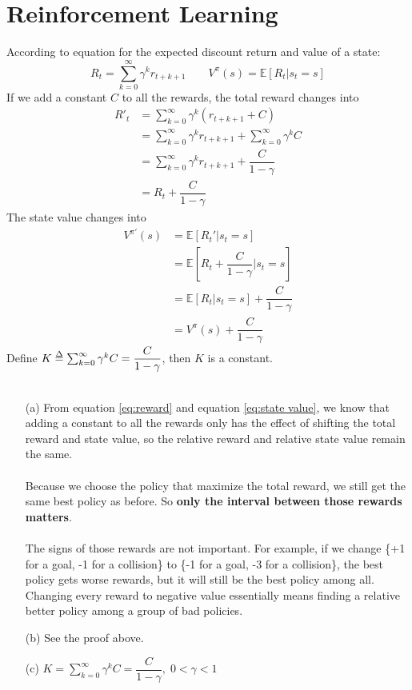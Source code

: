 \documentclass{article}
\def\delequal{\mathrel{\ensurestackMath{\stackon[1pt]{=}{\scriptstyle\Delta}}}}
\begin{document}
    \section{Reinforcement Learning \uppercase\expandafter{}}
    According to equation for the expected discount return and value of a state:
    $$R_t=\sum_{k=0}^{\infty}\gamma^kr_{t+k+1}\qquad V^{\pi}(s)=\mathbb{E}[R_t|s_t=s]$$
    If we add a constant $C$ to all the rewards, the total reward changes into
    \begin{equation}\label{eq:reward}
    	\begin{split}
    	R'_t
    	&=\sum_{k=0}^{\infty}\gamma^k(r_{t+k+1}+C)\\
    	&=\sum_{k=0}^{\infty}\gamma^kr_{t+k+1}+\sum_{k=0}^{\infty}\gamma^kC\\
    	&=\sum_{k=0}^{\infty}\gamma^kr_{t+k+1}+\dfrac{C}{1-\gamma} \\
    	&=R_t+\dfrac{C}{1-\gamma}
    	\end{split}
    \end{equation}
    The state value changes into
    \begin{equation}\label{eq:state value}
    	\begin{split}
    	V^{\pi'}(s)
    	&=\mathbb{E}[R_t'|s_t=s]\\
    	&=\mathbb{E}[R_t+\dfrac{C}{1-\gamma}|s_t=s]\\
    	&=\mathbb{E}[R_t|s_t=s]+\dfrac{C}{1-\gamma}\\
    	&=V^{\pi}(s)+\dfrac{C}{1-\gamma}
    	\end{split}
    \end{equation}
    Define $K\delequal\sum_{k=0}^{\infty}\gamma^kC=\dfrac{C}{1-\gamma}$, then $K$ is a constant.\\\\
    \begin{enumerate}
    	\item[(a)]
    	From equation \ref{eq:reward} and equation \ref{eq:state value}, we know that adding a constant to all the rewards only has the effect of shifting the total reward and state value, so the relative reward and relative state value remain the same. \\\\
    	Because we choose the policy that maximize the total reward, we still get the same best policy as before. So \textbf{only the interval between those rewards matters}.\\\\
    	The signs of those rewards are not important. For example, if we change \{+1 for a goal, -1 for a collision\} to \{-1 for a goal, -3 for a collision\}, the best policy gets worse rewards, but it will still be the best policy among all. Changing every reward to negative value essentially means finding a relative better policy among a group of bad policies.
    	\item[(b)]See the proof above.
    	\item[(c)]$K=\sum_{k=0}^{\infty}\gamma^kC=\dfrac{C}{1-\gamma},\; 0<\gamma<1$
    \end{enumerate}
    
\end{document}
